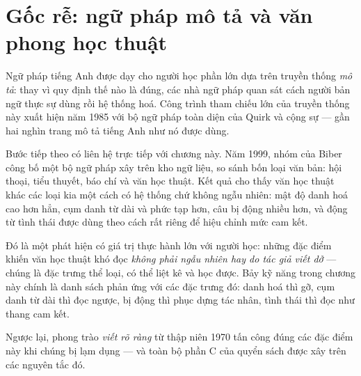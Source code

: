 \documentclass[../../english.tex]{subfiles}
\begin{document}
\section{Gốc rễ: ngữ pháp mô tả và văn phong học thuật}

Ngữ pháp tiếng Anh được dạy cho người học phần lớn dựa trên truyền thống \emph{mô tả}: thay vì quy định thế nào là đúng, các nhà ngữ pháp quan sát cách người bản ngữ thực sự dùng rồi hệ thống hoá. Công trình tham chiếu lớn của truyền thống này xuất hiện năm 1985 với bộ ngữ pháp toàn diện của Quirk và cộng sự\cite{quirk1985} --- gần hai nghìn trang mô tả tiếng Anh như nó được dùng.

Bước tiếp theo có liên hệ trực tiếp với chương này. Năm 1999, nhóm của Biber công bố một bộ ngữ pháp xây trên kho ngữ liệu, so sánh bốn loại văn bản: hội thoại, tiểu thuyết, báo chí và văn học thuật\cite{biber1999}. Kết quả cho thấy văn học thuật khác các loại kia một cách có hệ thống chứ không ngẫu nhiên: mật độ danh hoá cao hơn hẳn, cụm danh từ dài và phức tạp hơn, câu bị động nhiều hơn, và động từ tình thái được dùng theo cách rất riêng để hiệu chỉnh mức cam kết.

Đó là một phát hiện có giá trị thực hành lớn với người học: những đặc điểm khiến văn học thuật khó đọc \emph{không phải ngẫu nhiên hay do tác giả viết dở} --- chúng là đặc trưng thể loại, có thể liệt kê và học được. Bảy kỹ năng trong chương này chính là danh sách phản ứng với các đặc trưng đó: danh hoá thì gỡ, cụm danh từ dài thì đọc ngược, bị động thì phục dựng tác nhân, tình thái thì đọc như thang cam kết.

Ngược lại, phong trào \emph{viết rõ ràng} từ thập niên 1970 tấn công đúng các đặc điểm này khi chúng bị lạm dụng --- và toàn bộ phần C của quyển sách được xây trên các nguyên tắc đó.

\begin{gocre}
\end{gocre}
\end{document}
